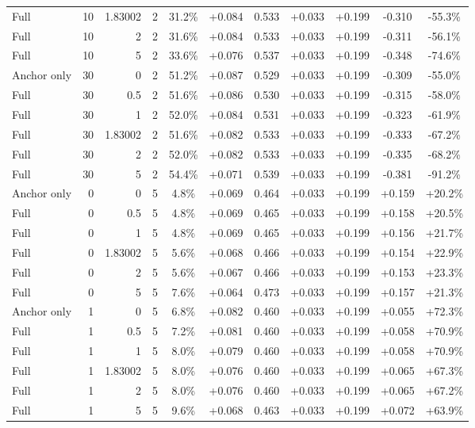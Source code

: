 \begin{table}[htbp]
\begin{tabular}{lrrrccccccc}
Full & 10 & 1.83002 & 2 & 31.2\% & +0.084 & 0.533 & +0.033 & +0.199 & -0.310 & -55.3\% \\
Full & 10 & 2 & 2 & 31.6\% & +0.084 & 0.533 & +0.033 & +0.199 & -0.311 & -56.1\% \\
Full & 10 & 5 & 2 & 33.6\% & +0.076 & 0.537 & +0.033 & +0.199 & -0.348 & -74.6\% \\
Anchor only & 30 & 0 & 2 & 51.2\% & +0.087 & 0.529 & +0.033 & +0.199 & -0.309 & -55.0\% \\
Full & 30 & 0.5 & 2 & 51.6\% & +0.086 & 0.530 & +0.033 & +0.199 & -0.315 & -58.0\% \\
Full & 30 & 1 & 2 & 52.0\% & +0.084 & 0.531 & +0.033 & +0.199 & -0.323 & -61.9\% \\
Full & 30 & 1.83002 & 2 & 51.6\% & +0.082 & 0.533 & +0.033 & +0.199 & -0.333 & -67.2\% \\
Full & 30 & 2 & 2 & 52.0\% & +0.082 & 0.533 & +0.033 & +0.199 & -0.335 & -68.2\% \\
Full & 30 & 5 & 2 & 54.4\% & +0.071 & 0.539 & +0.033 & +0.199 & -0.381 & -91.2\% \\
Anchor only & 0 & 0 & 5 & 4.8\% & +0.069 & 0.464 & +0.033 & +0.199 & +0.159 & +20.2\% \\
Full & 0 & 0.5 & 5 & 4.8\% & +0.069 & 0.465 & +0.033 & +0.199 & +0.158 & +20.5\% \\
Full & 0 & 1 & 5 & 4.8\% & +0.069 & 0.465 & +0.033 & +0.199 & +0.156 & +21.7\% \\
Full & 0 & 1.83002 & 5 & 5.6\% & +0.068 & 0.466 & +0.033 & +0.199 & +0.154 & +22.9\% \\
Full & 0 & 2 & 5 & 5.6\% & +0.067 & 0.466 & +0.033 & +0.199 & +0.153 & +23.3\% \\
Full & 0 & 5 & 5 & 7.6\% & +0.064 & 0.473 & +0.033 & +0.199 & +0.157 & +21.3\% \\
Anchor only & 1 & 0 & 5 & 6.8\% & +0.082 & 0.460 & +0.033 & +0.199 & +0.055 & +72.3\% \\
Full & 1 & 0.5 & 5 & 7.2\% & +0.081 & 0.460 & +0.033 & +0.199 & +0.058 & +70.9\% \\
Full & 1 & 1 & 5 & 8.0\% & +0.079 & 0.460 & +0.033 & +0.199 & +0.058 & +70.9\% \\
Full & 1 & 1.83002 & 5 & 8.0\% & +0.076 & 0.460 & +0.033 & +0.199 & +0.065 & +67.3\% \\
Full & 1 & 2 & 5 & 8.0\% & +0.076 & 0.460 & +0.033 & +0.199 & +0.065 & +67.2\% \\
Full & 1 & 5 & 5 & 9.6\% & +0.068 & 0.463 & +0.033 & +0.199 & +0.072 & +63.9\% \\

\end{tabular}
\end{table}
